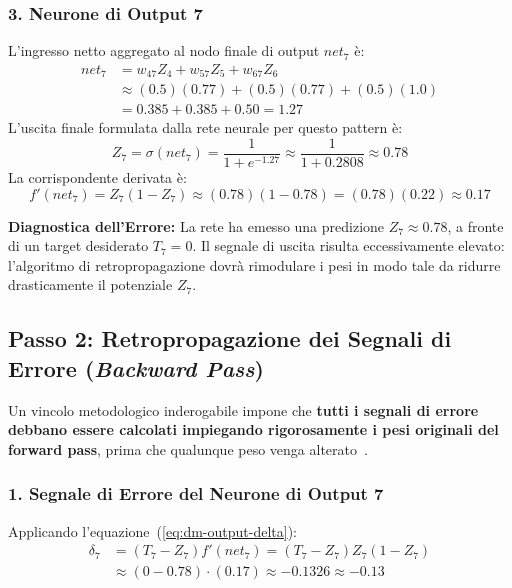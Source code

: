 \subsubsection{3. Neurone di Output 7}
L'ingresso netto aggregato al nodo finale di output $net_7$ è:
\begin{align}
    net_7 &= w_{47} Z_4 + w_{57} Z_5 + w_{67} Z_6 \nonumber \\
          &\approx (0.5)(0.77) + (0.5)(0.77) + (0.5)(1.0) \nonumber \\
          &= 0.385 + 0.385 + 0.50 = 1.27
\end{align}
L'uscita finale formulata dalla rete neurale per questo pattern è:
\begin{equation}
    Z_7 = \sigma(net_7) = \frac{1}{1 + e^{-1.27}} \approx \frac{1}{1 + 0.2808} \approx \mathbf{0.78}
\end{equation}
La corrispondente derivata è:
\begin{equation}
    f'(net_7) = Z_7 (1 - Z_7) \approx (0.78)(1 - 0.78) = (0.78)(0.22) \approx \mathbf{0.17}
\end{equation}

\textbf{Diagnostica dell'Errore:} La rete ha emesso una predizione $Z_7 \approx 0.78$, a fronte di un target desiderato $T_7 = 0$. Il segnale di uscita risulta eccessivamente elevato: l'algoritmo di retropropagazione dovrà rimodulare i pesi in modo tale da ridurre drasticamente il potenziale $Z_7$.

\FloatBarrier
\subsection{Passo 2: Retropropagazione dei Segnali di Errore (\textit{Backward Pass})}
\label{subsec:dm-step2-error-propagation}

Un vincolo metodologico inderogabile impone che \textbf{tutti i segnali di errore debbano essere calcolati impiegando rigorosamente i pesi originali del forward pass}, prima che qualunque peso venga alterato~\cite{mannocci2026}.

\subsubsection{1. Segnale di Errore del Neurone di Output 7}
Applicando l'equazione~(\ref{eq:dm-output-delta}):
\begin{align}
    \delta_7 &= (T_7 - Z_7) f'(net_7) = (T_7 - Z_7) Z_7 (1 - Z_7) \nonumber \\
             &\approx (0 - 0.78) \cdot (0.17) \approx -0.1326 \approx \mathbf{-0.13}
\end{align}

